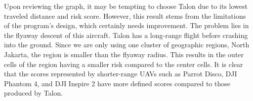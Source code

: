 \documentclass[12pt]{report}
\begin{document}
        \begin{table}[H]
            \centering
            \caption{Areal map risk statistic of North Jakarta in (\%) probability} %
            \label{tab:total-map-risk}
        \end{table}

        Upon reviewing the graph, it may be tempting to choose Talon due to its lowest traveled distance and risk score.
        However, this result stems from the limitations of the program's design, which certainly needs improvement. The
        problem lies in the flyaway descent of this aircraft. Talon has a long-range flight before crashing into the
        ground. Since we are only using one cluster of geographic regions, North Jakarta, the region is smaller than the
        flyaway radius. This results in the outer cells of the region having a smaller risk compared to the center
        cells. It is clear that the scores represented by shorter-range UAVs such as Parrot Disco, DJI Phantom 4, and
        DJI Inspire 2 have more defined scores compared to those produced by Talon.
\end{document}
